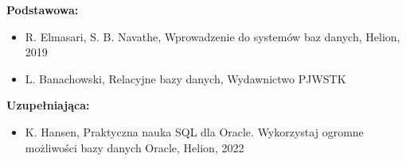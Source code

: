 \documentclass[12pt, a4paper]{article}
\begin{document}
\textbf{Podstawowa:}
\begin{itemize}
  \item R. Elmasari, S. B. Navathe, Wprowadzenie do systemów baz danych, Helion, 2019
  \item L. Banachowski, Relacyjne bazy danych, Wydawnictwo PJWSTK
\end{itemize}

\textbf{Uzupełniająca:}
\begin{itemize}
  \item K. Hansen, Praktyczna nauka SQL dla Oracle. Wykorzystaj ogromne możliwości bazy danych Oracle, Helion, 2022
\end{itemize}
\end{document}
